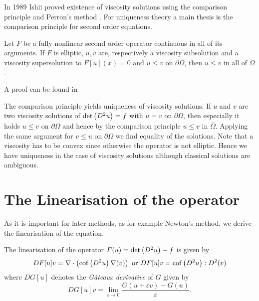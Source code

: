 In 1989 Ishii proved existence of viscosity solutions using the comparison principle and Perron's method \cite{Ishii1989}. For uniqueness theory a main thesis is the comparison principle for second order equations.

\begin{theorem}
	Let $F$ be a fully nonlinear second order operator continuous in all of its arguments.
	If $F$ is elliptic,	$u,v$ are, respectively a viscosity subsolution and a viscosity supersolution to $F[u](x)=0$ and $u \leq v$ on $\partial \Omega$, then $u \leq v$ in all of $\overline \Omega$.
\end{theorem}
A proof can be found in \cite[Theorem 17.1]{GT1983}

The comparison principle yields uniqueness of viscosity solutions. If $u$ and $v$ are two viscosity solutions of $\det{\left(D^2 u\right)}=f$ with $u=v$ on $\partial \Omega$, then especially it holds $u \leq v$ on $\partial \Omega$ and hence by the comparison principle $u \leq v$ in  $\overline \Omega$. Applying the same argument for $v \leq u$ on $\partial \Omega$ we find equality of the solutions. Note that a viscosity has to be convex since otherwise the \MA operator is not elliptic. Hence we have uniqueness in the case of viscosity solutions although classical solutions are ambiguous.

\section{The Linearisation of the \MA operator}\label{sec: linearisation}

As it is important for later methods, as for example Newton's method, we derive the linearisation of the \MA equation. 
	\begin{theorem}[Linearisation] \label{thm: linearisation}
		The linearisation of the \MA operator $F(u)=\det{\left(D^2u\right)}-f$ is given by
		\begin{align}
			DF[u]v = \nabla \cdot \left( \operatorname{cof} \left( D^2 u  \right) \nabla (v) \right) \text{ or } DF[u]v=\operatorname{cof} \left( D^2 u \right):D^2 (v)		\end{align}
	where $DG[u]$ denotes the \emph{G\^ateaux derivative} of $G$ given by
	\[
		DG[u]v = \lim\limits_{\varepsilon \rightarrow 0} \frac { G(u+\varepsilon v) - G(u)}\varepsilon.
	\]
	\end{theorem}
		
